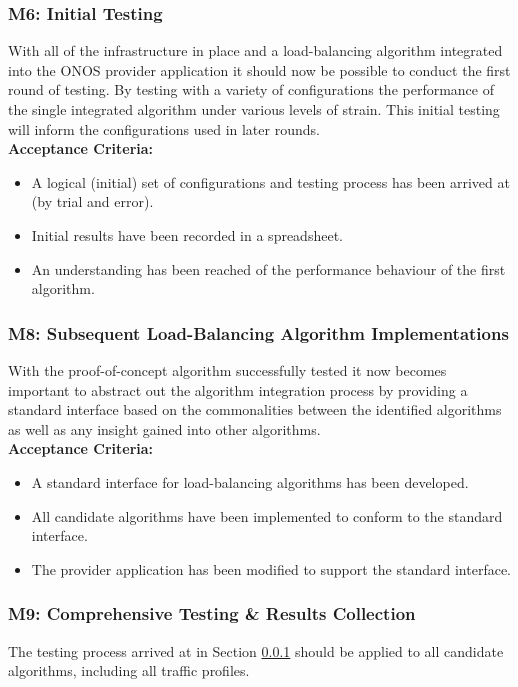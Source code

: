 \subsubsection{M6: Initial Testing} \label{test0}
With all of the infrastructure in place and a load-balancing algorithm integrated into the ONOS provider application it should now be possible to conduct the first round of testing. By testing with a variety of configurations the performance of the single integrated algorithm under various levels of strain. This initial testing will inform the configurations used in later rounds. \\

\textbf{Acceptance Criteria:}
\begin{itemize}
    \item A logical (initial) set of configurations and testing process has been arrived at (by trial and error).
    \item Initial results have been recorded in a spreadsheet.
    \item An understanding has been reached of the performance behaviour of the first algorithm.
\end{itemize}

\subsubsection{M8: Subsequent Load-Balancing Algorithm Implementations}
With the proof-of-concept algorithm successfully tested it now becomes important to abstract out the algorithm integration process by providing a standard interface based on the commonalities between the identified algorithms as well as any insight gained into other algorithms. \\

\textbf{Acceptance Criteria:}
\begin{itemize}
    \item A standard interface for load-balancing algorithms has been developed.
    \item All candidate algorithms have been implemented to conform to the standard interface.
    \item The provider application has been modified to support the standard interface.
\end{itemize}

\subsubsection{M9: Comprehensive Testing \& Results Collection}
The testing process arrived at in Section \ref{test0} should be applied to all candidate algorithms, including all traffic profiles. \\

